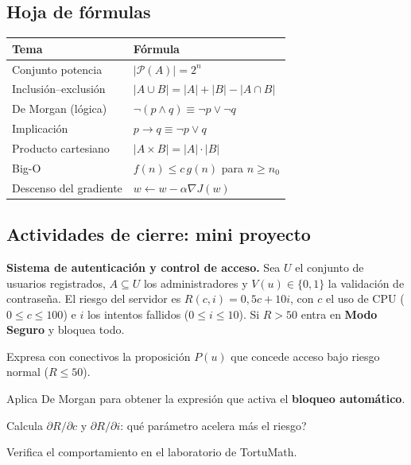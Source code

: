 \subsection{Hoja de f\'ormulas}
\begin{center}
\begin{tabular}{|p{4.2cm}|p{8.4cm}|}
\hline
\rowcolor{tmAzulClaro}\textbf{Tema} & \textbf{F\'ormula}\\ \hline
Conjunto potencia & $|\mathcal P(A)|=2^n$\\ \hline
Inclusi\'on--exclusi\'on & $|A\cup B|=|A|+|B|-|A\cap B|$\\ \hline
De Morgan (l\'ogica) & $\neg(p\wedge q)\equiv\neg p\vee\neg q$\\ \hline
Implicaci\'on & $p\to q\equiv\neg p\vee q$\\ \hline
Producto cartesiano & $|A\times B|=|A|\cdot|B|$\\ \hline
Big-O & $f(n)\le c\,g(n)$ para $n\ge n_0$\\ \hline
Descenso del gradiente & $w\leftarrow w-\alpha\nabla J(w)$\\ \hline
\end{tabular}
\end{center}

\subsection{Actividades de cierre: mini proyecto}
\begin{tmsistemas}
\textbf{Sistema de autenticaci\'on y control de acceso.} Sea $U$ el conjunto de usuarios registrados, $A\subseteq U$ los administradores y $V(u)\in\{0, 1\}$ la validaci\'on de contrase\~na. El riesgo del servidor es $R(c, i)=0{,}5c+10i$, con $c$ el uso de CPU ($0\le c\le100$) e $i$ los intentos fallidos ($0\le i\le10$). Si $R>50$ entra en \textbf{Modo Seguro} y bloquea todo.
\end{tmsistemas}

\begin{tmlista}
\item Expresa con conectivos la proposici\'on $P(u)$ que concede acceso bajo riesgo normal ($R\le50$).
\item Aplica De Morgan para obtener la expresi\'on que activa el \textbf{bloqueo autom\'atico}.
\item Calcula $\partial R/\partial c$ y $\partial R/\partial i$: \textquestiondown qu\'e par\'ametro acelera m\'as el riesgo?
\item Verifica el comportamiento en el laboratorio de TortuMath.
\end{tmlista}

